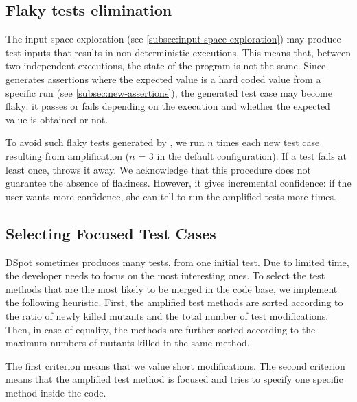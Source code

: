 \subsection{Flaky tests elimination}
The input space exploration (see \autoref{subsec:input-space-exploration}) may produce test inputs that results in non-deterministic executions.
This means that, between two independent executions, the state of the program is not the same.
Since \dspot generates assertions where the expected value is a hard coded value from a specific run (see \autoref{subsec:new-assertions}), the generated test case may become flaky: it passes or fails depending on the execution and whether the expected value is obtained or not.

To avoid such flaky tests generated by \dspot, we run $n$ times each new test case resulting from amplification ($n$ = 3 in the default configuration). 
If a test fails at least once, \dspot throws it away. 
We acknowledge that this procedure does not guarantee the absence of flakiness. 
However, it gives incremental confidence: if the user wants more confidence, she can tell \dspot to run the amplified tests more times.


\subsection{Selecting Focused Test Cases}
\label{subsubsec:test:cases:selection:for:pr}

DSpot  sometimes produces many tests, from one initial test.
Due to limited time, the developer needs to focus on the most interesting ones.
To select the test methods that are the most likely to be merged in the code base, we implement the following  heuristic.
First, the amplified test methods are sorted according to the ratio of newly killed mutants and the total number of test modifications.
Then, in case of equality, the methods are further sorted according to the maximum numbers of mutants killed in the same method.

The first criterion means that we value short modifications.
The second criterion means that the amplified test method is focused and tries to specify one specific method inside the code.

